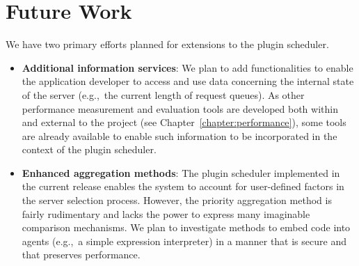 %
%


\section{Future Work}

We have two primary efforts planned for extensions to the plugin
scheduler.
\begin{itemize}
\item \textbf{Additional information services}: We plan to add
  functionalities to enable the application developer to access and use
  data concerning the internal state of the \diet server (e.g.,~the
  current length of request queues).  As other performance measurement
  and evaluation tools are developed both within and external to the
  \diet project (see Chapter~\ref{chapter:performance}), some
  tools are already available to enable such 
  information to be incorporated
  in the context of the plugin scheduler.
\item \textbf{Enhanced aggregation methods}: The plugin scheduler
  implemented in the current release enables the \diet system to
  account for user-defined factors in the server selection process.
  However, the priority aggregation method is fairly rudimentary and
  lacks the power to express many imaginable comparison mechanisms.
  We plan to investigate methods to embed code into \diet agents
  (e.g.,~a simple expression interpreter) in a manner that is secure
  and that preserves performance.
\end{itemize}


